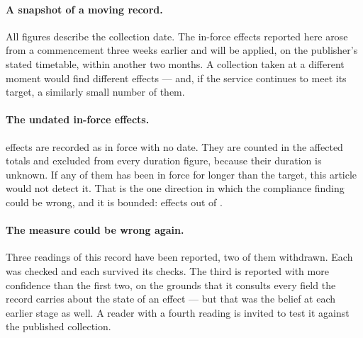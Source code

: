 \documentclass[11pt]{article}
\begin{document}
\paragraph{A snapshot of a moving record.} All figures describe the collection
date. The in-force effects reported here arose from a commencement three weeks
earlier and will be applied, on the publisher's stated timetable, within
another two months. A collection taken at a different moment would find
different effects --- and, if the service continues to meet its target, a
similarly small number of them.

\paragraph{The undated in-force effects.} \nInForceUndated{} effects are
recorded as in force with no date. They are counted in the affected totals and
excluded from every duration figure, because their duration is unknown. If any
of them has been in force for longer than the target, this article would not
detect it. That is the one direction in which the compliance finding could be
wrong, and it is bounded: \nInForceUndated{} effects out of \nFlagged{}.



\paragraph{The measure could be wrong again.} Three readings of this record
have been reported, two of them withdrawn. Each was checked and each survived
its checks. The third is reported with more confidence than the first two, on
the grounds that it consults every field the record carries about the state of
an effect --- but that was the belief at each earlier stage as well. A reader
with a fourth reading is invited to test it against the published collection.
\end{document}
